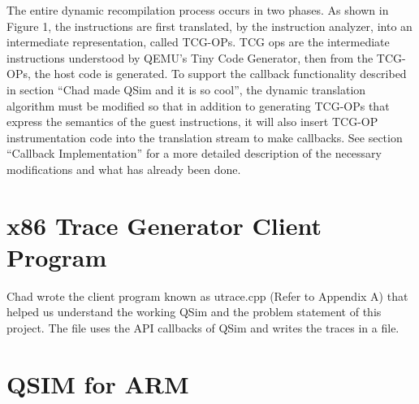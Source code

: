 \documentclass[letterpaper,11pt,twocolumn]{article}
\begin{document}
The entire dynamic recompilation process occurs in two phases. As shown in Figure 1, the instructions are first translated, by the instruction analyzer, into an intermediate representation, called TCG-OPs. TCG ops are the intermediate instructions understood by QEMU's Tiny Code Generator, then from the TCG-OPs, the host code is generated.
To support the callback functionality described in section “Chad made QSim and it is so cool”, the dynamic translation algorithm must be modified so that in addition to generating TCG-OPs that express the semantics of the guest instructions, it will also insert TCG-OP instrumentation code into the translation stream to make callbacks. See section “Callback Implementation” for a more detailed description of the necessary modifications and what has already been done.
\section{x86 Trace Generator Client Program}
Chad wrote the client program known as utrace.cpp (Refer to Appendix A) that helped us understand the working QSim and the problem statement of this project. The file uses the API callbacks of QSim and writes the traces in a file.
\section{QSIM for ARM}
\end{document}
